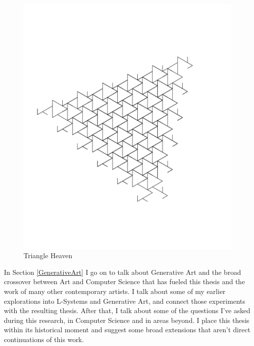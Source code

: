 \documentclass[12pt,twoside]{reedthesis}
\begin{document}
	\begin{figure}[h]
	\centering
	\includegraphics[clip=true, viewport=0.5in 2in 9.5in 10in, scale=0.4]{Images/ThePathWeWillFollow2}
	\caption[Triangle Heaven]{Triangle Heaven\footnotemark}
	\label {Motivations3}
	\end{figure}
	
	In Section \ref{GenerativeArt} I go on to talk about Generative Art and the broad crossover between Art and Computer Science that has fueled this thesis and the work of many other contemporary artists. I talk about some of my earlier explorations into L-Systems and Generative Art, and connect those experiments with the resulting thesis. After that, I talk about some of the questions I've asked during this research, in Computer Science and in areas beyond. I place this thesis within its historical moment and suggest some broad extensions that aren't direct continuations of this work.
	
\end{document}

